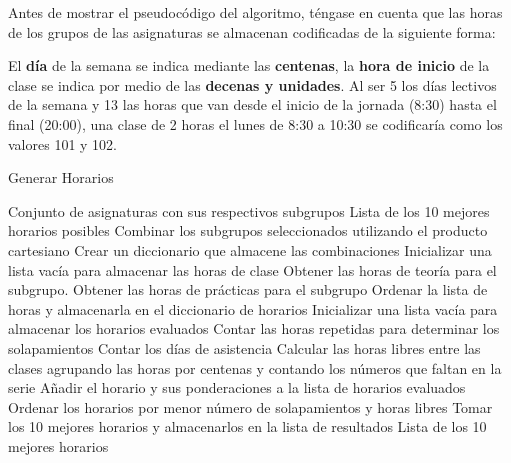 Antes de mostrar el pseudocódigo del algoritmo, téngase en cuenta que las horas de los grupos de las asignaturas se almacenan codificadas de la siguiente forma:\newline

El \textbf{día} de la semana se indica mediante las \textbf{centenas}, la \textbf{hora de inicio} de la clase se indica por medio de las \textbf{decenas y unidades}. Al ser 5 los días lectivos de la semana y 13 las horas que van desde el inicio de la jornada (8:30) hasta el final (20:00), una clase de 2 horas el lunes de 8:30 a 10:30 se codificaría como los valores 101 y 102.\newline


\begin{algorithm}
    \caption{Generar Horarios}
    \label{alg:generar_horarios}
    \begin{algorithmic}[1]
        \Require Conjunto de asignaturas con sus respectivos subgrupos
        \Ensure Lista de los 10 mejores horarios posibles
            \State Combinar los subgrupos seleccionados utilizando el producto cartesiano
            \State Crear un diccionario que almacene las combinaciones
                \State Inicializar una lista vacía para almacenar las horas de clase
                    \State Obtener las horas de teoría para el subgrupo.
                    \State Obtener las horas de prácticas para el subgrupo
                \EndFor
                \State Ordenar la lista de horas y almacenarla en el diccionario de horarios
            \EndFor
            \State Inicializar una lista vacía para almacenar los horarios evaluados
                \State Contar las horas repetidas para determinar los solapamientos
                \State Contar los días de asistencia
                \State Calcular las horas libres entre las clases agrupando las horas
                \State por centenas y contando los números que faltan en la serie
                \State Añadir el horario y sus ponderaciones a la lista de horarios evaluados
            \EndFor
            \State Ordenar los horarios por menor número de solapamientos y horas libres
            \State Tomar los 10 mejores horarios y almacenarlos en la lista de resultados
            \Return Lista de los 10 mejores horarios
        \EndFunction
    \end{algorithmic}
\end{algorithm}

